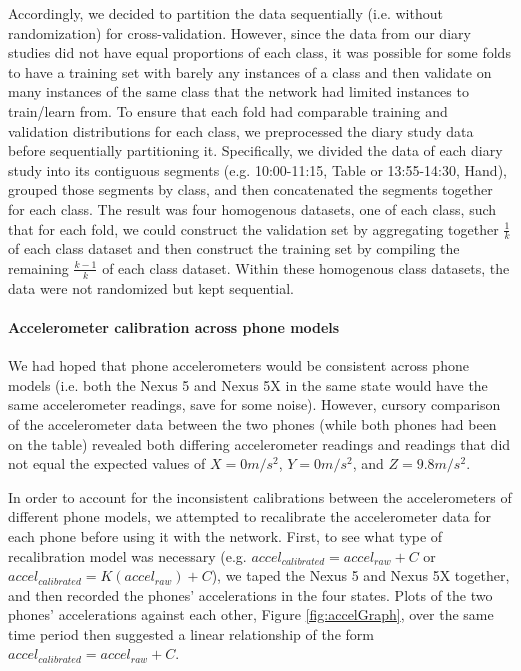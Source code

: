 Accordingly, we decided to partition the data sequentially (i.e. without randomization)
for cross-validation. However, since the data from our diary studies
did not have equal proportions of each class, it was possible for some folds
to have a training set with barely any instances of a class and then validate
on many instances of the same class that the network had limited instances
to train/learn from. To ensure that each fold had comparable training and validation distributions 
for each class, we preprocessed the diary study data before sequentially partitioning it. 
Specifically, we divided the data of each diary study into its 
contiguous segments (e.g. 10:00-11:15, Table or 13:55-14:30, Hand), grouped 
those segments by class, and then concatenated the segments together for each class. The result was four 
homogenous datasets, one of each class, such that for each fold, we could construct
the validation set by aggregating together $\frac{1}{k}$ of each class dataset and then
construct the training set by compiling the remaining $\frac{k - 1}{k}$ of each class dataset.
Within these homogenous class datasets, the data were not randomized but 
kept sequential.

\paragraph{Accelerometer calibration across phone models}
We had hoped that phone accelerometers would be consistent across phone models (i.e.
both the Nexus 5 and Nexus 5X in the same state would have the same accelerometer
readings, save for some noise). However, cursory comparison of the accelerometer data between the two phones 
(while both phones had been on the table) revealed both differing accelerometer readings and readings
that did not equal the expected values of $X = 0m/s^2$, $Y = 0m/s^2$, and $Z = 9.8m/s^2$. 




In order to account for the inconsistent calibrations between the accelerometers of different phone models, we
attempted to recalibrate the accelerometer data for each phone before using it with the network. 
First, to see what type of recalibration model was necessary (e.g. $accel_{calibrated} = accel_{raw} + C$ or
$accel_{calibrated} = K(accel_{raw}) + C$), we taped the Nexus 5 and Nexus 5X together, and then recorded
the phones' accelerations in the four states. Plots of the two phones' accelerations against each other, Figure \ref{fig:accelGraph}, over the same time period
then suggested a linear relationship of the form $accel_{calibrated} = accel_{raw} + C$. 

